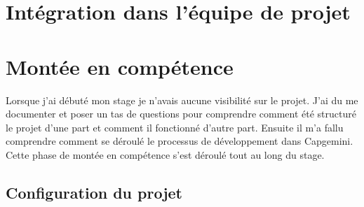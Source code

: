 \chapter{Intégration dans l'équipe de projet}

\chapter{Montée en compétence}
Lorsque j'ai débuté mon stage je n'avais aucune visibilité sur le projet.
J'ai du me documenter et poser un tas de questions pour comprendre comment été structuré le projet d'une part et comment il fonctionné d'autre part. Ensuite il m'a fallu comprendre comment se déroulé le processus de développement dans Capgemini.
Cette phase de montée en compétence s'est déroulé tout au long du stage.

\section{Configuration du projet}
